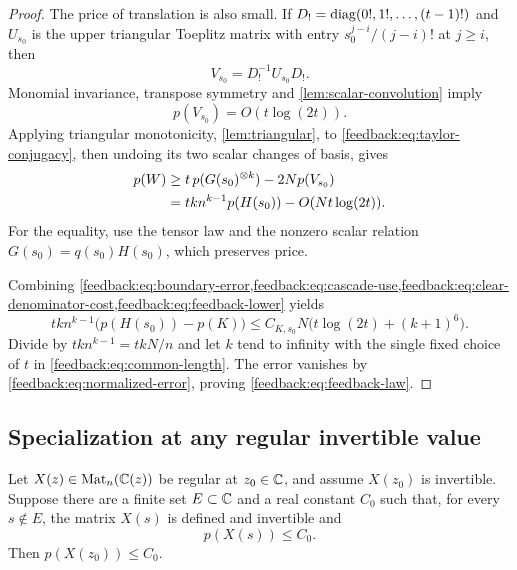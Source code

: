 \begin{proof}
The price of translation is also small.  If $D_!=\operatorname{diag}(0!,1!,\ldots,
(t-1)!)$ and $U_{s_0}$ is the upper triangular Toeplitz matrix with
entry $s_0^{j-i}/(j-i)!$ at $j\geq i$, then
\[
 V_{s_0}=D_!^{-1}U_{s_0}D_!.
\]
Monomial invariance, transpose symmetry and
\cref{lem:scalar-convolution} imply
\begin{equation}
 p(V_{s_0})=O(t\log(2t)).
 \label{feedback:eq:translation-price}
\end{equation}
Applying triangular monotonicity, \cref{lem:triangular}, to
\cref{feedback:eq:taylor-conjugacy}, then undoing its two scalar
changes of basis, gives
\begin{align}
 p(W)
 &\geq t\,p(G(s_0)^{\otimes k})-2Np(V_{s_0})\notag\\
 &=tk n^{k-1}p(H(s_0))-O(Nt\log(2t)).
 \label{feedback:eq:feedback-lower}
\end{align}
For the equality, use the tensor law and the nonzero scalar relation
$G(s_0)=q(s_0)H(s_0)$, which preserves price.

Combining \cref{feedback:eq:boundary-error,feedback:eq:cascade-use,feedback:eq:clear-denominator-cost,feedback:eq:feedback-lower} yields
\[
 tk n^{k-1}\bigl(p(H(s_0))-p(K)\bigr)
 \leq C_{K,s_0}N\bigl(t\log(2t)+(k+1)^6\bigr).
\]
Divide by $tk n^{k-1}=tkN/n$ and let $k$ tend to infinity with the
single fixed choice of $t$ in \cref{feedback:eq:common-length}.  The error
vanishes by \cref{feedback:eq:normalized-error}, proving
\cref{feedback:eq:feedback-law}.
\end{proof}

\subsection{Specialization at any regular invertible value}

\begin{theorem}
\label{thm:specialization}
Let $X(z)\in\operatorname{Mat}_n(\mathbb C(z))$ be regular at $z_0\in\mathbb C$, and assume
$X(z_0)$ is invertible.  Suppose there are a finite set $E\subset\mathbb C$
and a real constant $C_0$ such that, for every $s\notin E$, the matrix
$X(s)$ is defined and invertible and
\[
 p(X(s))\leq C_0.
\]
Then $p(X(z_0))\leq C_0$.
\end{theorem}

